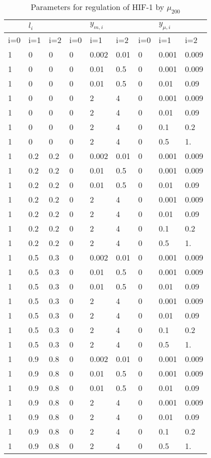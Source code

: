 \documentclass{article}
\begin{document}
\begin{table}[]
\begin{tabular}{lll|lll|lll}
   & $l_i$ &   &     &   $y_{m,i}$  &     &    & $y_{\mu,i}$    & \\
\hline
 i=0 & i=1 & i=2 & i=0 & i=1 & i=2 & i=0 & i=1 & i=2 \\
\hline
 1 & 0   & 0   & 0 & 0.002 & 0.01 & 0 & 0.001  & 0.009\\ 
 1 & 0   & 0   & 0 & 0.01  & 0.5  & 0 & 0.001  & 0.009\\ 
 1 & 0   & 0   & 0 & 0.01  & 0.5  & 0 & 0.01   & 0.09\\
 1 & 0   & 0   & 0 & 2     & 4    & 0 & 0.001  & 0.009\\ 
1 & 0   & 0   & 0 & 2     & 4    & 0 & 0.01   & 0.09\\
 1 & 0   & 0   & 0 & 2     & 4    & 0 & 0.1    & 0.2\\
 1 & 0   & 0   & 0 & 2     & 4    & 0 & 0.5    & 1.\\
 1 & 0.2 & 0.2 & 0 & 0.002 & 0.01 & 0 & 0.001  & 0.009\\ 
 1 & 0.2 & 0.2 & 0 & 0.01  & 0.5  & 0 & 0.001  & 0.009\\ 
 1 & 0.2 & 0.2 & 0 & 0.01  & 0.5  & 0 & 0.01   & 0.09\\
 1 & 0.2 & 0.2 & 0 & 2     & 4    & 0 & 0.001  & 0.009\\ 
 1 & 0.2 & 0.2 & 0 & 2     & 4    & 0 & 0.01   & 0.09\\
 1 & 0.2 & 0.2 & 0 & 2     & 4    & 0 & 0.1    & 0.2\\
 1 & 0.2 & 0.2 & 0 & 2     & 4    & 0 & 0.5    & 1.\\
 1 & 0.5 & 0.3 & 0 & 0.002 & 0.01 & 0 & 0.001  & 0.009\\ 
 1 & 0.5 & 0.3 & 0 & 0.01  & 0.5  & 0 & 0.001  & 0.009\\ 
 1 & 0.5 & 0.3 & 0 & 0.01  & 0.5  & 0 & 0.01   & 0.09\\
 1 & 0.5 & 0.3 & 0 & 2     & 4    & 0 & 0.001  & 0.009\\ 
 1 & 0.5 & 0.3 & 0 & 2     & 4    & 0 & 0.01   & 0.09\\
 1 & 0.5 & 0.3 & 0 & 2     & 4    & 0 & 0.1    & 0.2\\
 1 & 0.5 & 0.3 & 0 & 2     & 4    & 0 & 0.5    & 1.\\
 1 & 0.9 & 0.8 & 0 & 0.002 & 0.01 & 0 & 0.001  & 0.009\\ 
 1 & 0.9 & 0.8 & 0 & 0.01  & 0.5  & 0 & 0.001  & 0.009\\ 
 1 & 0.9 & 0.8 & 0 & 0.01  & 0.5  & 0 & 0.01   & 0.09\\
 1 & 0.9 & 0.8 & 0 & 2     & 4    & 0 & 0.001  & 0.009\\ 
 1 & 0.9 & 0.8 & 0 & 2     & 4    & 0 & 0.01   & 0.09\\
1 & 0.9 & 0.8 & 0 & 2     & 4    & 0 & 0.1    & 0.2\\
 1 & 0.9 & 0.8 & 0 & 2     & 4    & 0 & 0.5    & 1.\\
\end{tabular}
\label{table:uhparams}
\caption{Parameters for regulation of HIF-1 by $\mu_{200}$}
\end{table}
\end{document}

